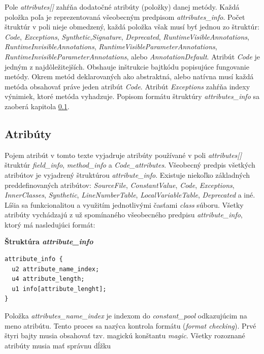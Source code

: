 \documentclass[11pt,final,oneside]{fithesis}
\newenvironment{example}[1]
{
\vspace{3mm}
\noindent\textbf{#1}
\vspace{2mm}
}
{
\vspace{3mm}
}
\begin{document}
Pole \textit{attributes[]} zahŕňa dodatočné atribúty (položky) danej metódy.
Každá položka poľa je reprezentovaná všeobecným predpisom
\textit{attributes\_info}. Počet štruktúr v poli nieje obmedzený, každá
položka však musí byť jednou zo štruktúr: \textit{Code}, \textit{Exceptions},
\textit{Synthetic},\textit{Signature}, \textit{Deprecated},
\textit{RuntimeVisibleAnnotations}, \textit{RuntimeInvisibleAnnotations},
\textit{RuntimeVisibleParameterAnnotations},
\textit{RuntimeInvisibleParameterAnnotations},
alebo \textit{AnnotationDefault}.
Atribút \textit{Code} je jedným z najdôležitejších. Obshauje inštrukcie
bajtkódu popisujúce fungovanie metódy. Okrem metód deklarovaných ako
abstraktná, alebo natívna musí každá metóda obsahovať práve jeden atribút
\textit{Code}. Atribút \textit{Exceptions} zahŕňa indexy výnimiek, ktoré
metóda vyhadzuje. Popisom formátu štruktúry \textit{attributes\_info} sa
zaoberá kapitola \ref{sec:attributes}.

\subsection{Atribúty}
\label{sec:attributes}
Pojem atribút v tomto texte vyjadruje atribúty používané v poli
\textit{attributes[]} štruktúr \textit{field\_info}, \textit{method\_info} a
\textit{Code\_attributes}. Všeobecný predpis všetkých atribútov je vyjadrený
štruktúrou \textit{attribute\_info}. Existuje niekoľko základných
preddefinovaných atribútov: \textit{SourceFile}, \textit{ConstantValue},
\textit{Code}, \textit{Exceptions}, \textit{InnerClasses}, \textit{Synthetic},
\textit{LineNumberTable}, \textit{LocalVariableTable}, \textit{Deprecated} a
iné. Líšia sa funkcionalitou a využitím jednotlivými časťami \textit{class}
súboru. Všetky atribúty vychádzajú z už spomínaného všeobecného predpisu
\textit{attribute\_info}, ktorý má nasledujúci formát:

\begin{example}{Štruktúra \textit{attribute\_info}}
\begin{verbatim}
attribute_info {
  u2 attribute_name_index;
  u4 attribute_length;
  u1 info[attribute_lenght];
}
\end{verbatim}
\end{example}

Položka \textit{attributes\_name\_index} je indexom do \textit{constant\_pool}
odkazujúcim na meno atribútu. Tento proces sa nazýca kontrola formátu
(\textit{format checking}). Prvé štyri bajty musia obsahovať tzv. magickú
konštantu \textit{magic}. Všetky rozoznané atribúty musia mať správnu dĺžku 
\end{document}

